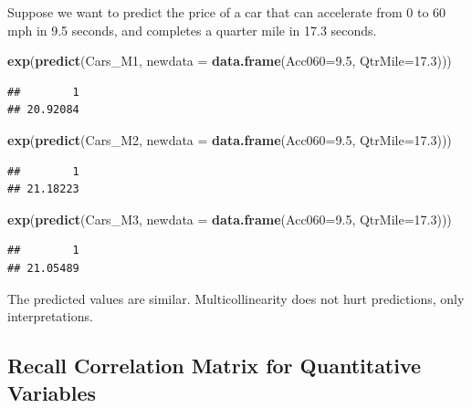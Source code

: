\documentclass[]{book}
\newenvironment{Shaded}{\begin{snugshade}}{\end{snugshade}}
\newcommand{\KeywordTok}[1]{\textcolor[rgb]{0.13,0.29,0.53}{\textbf{#1}}}
\newcommand{\DataTypeTok}[1]{\textcolor[rgb]{0.13,0.29,0.53}{#1}}
\newcommand{\FloatTok}[1]{\textcolor[rgb]{0.00,0.00,0.81}{#1}}
\newcommand{\NormalTok}[1]{#1}
\begin{document}
Suppose we want to predict the price of a car that can accelerate from 0
to 60 mph in 9.5 seconds, and completes a quarter mile in 17.3 seconds.

\begin{Shaded}
\begin{Highlighting}[]
\KeywordTok{exp}\NormalTok{(}\KeywordTok{predict}\NormalTok{(Cars_M1, }\DataTypeTok{newdata =} \KeywordTok{data.frame}\NormalTok{(}\DataTypeTok{Acc060=}\FloatTok{9.5}\NormalTok{, }\DataTypeTok{QtrMile=}\FloatTok{17.3}\NormalTok{)))}
\end{Highlighting}
\end{Shaded}

\begin{verbatim}
##        1 
## 20.92084
\end{verbatim}

\begin{Shaded}
\begin{Highlighting}[]
\KeywordTok{exp}\NormalTok{(}\KeywordTok{predict}\NormalTok{(Cars_M2, }\DataTypeTok{newdata =} \KeywordTok{data.frame}\NormalTok{(}\DataTypeTok{Acc060=}\FloatTok{9.5}\NormalTok{, }\DataTypeTok{QtrMile=}\FloatTok{17.3}\NormalTok{)))}
\end{Highlighting}
\end{Shaded}

\begin{verbatim}
##        1 
## 21.18223
\end{verbatim}

\begin{Shaded}
\begin{Highlighting}[]
\KeywordTok{exp}\NormalTok{(}\KeywordTok{predict}\NormalTok{(Cars_M3, }\DataTypeTok{newdata =} \KeywordTok{data.frame}\NormalTok{(}\DataTypeTok{Acc060=}\FloatTok{9.5}\NormalTok{, }\DataTypeTok{QtrMile=}\FloatTok{17.3}\NormalTok{)))}
\end{Highlighting}
\end{Shaded}

\begin{verbatim}
##        1 
## 21.05489
\end{verbatim}

The predicted values are similar. Multicollinearity does not hurt
predictions, only interpretations.

\subsection{Recall Correlation Matrix for Quantitative
Variables}\label{recall-correlation-matrix-for-quantitative-variables}
\end{document}
